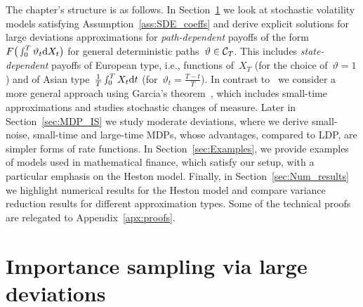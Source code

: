 
The chapter's structure is as follows. In Section~\ref{sec:LDP_IS} we look at stochastic volatility models satisfying Assumption~\ref{ass:SDE_coeffs} and derive explicit solutions for large deviations approximations for \textit{path-dependent} payoffs of the form~$F\big(\smallint _0^T\vartheta_t\mathrm{d} X_t\big)$ for general deterministic  paths~$\vartheta\in\mathcal{C}_T$. This includes \textit{state-dependent} payoffs of European type, i.e., functions of~$X_T$ (for the choice of~$\vartheta = 1$) and of Asian type~$\frac{1}{T}\smallint_0^TX_t\mathrm{d} t$ (for~$\vartheta_t = \frac{T-t}{T}$). In contrast to~\cite{Robertson2010SampleModels} we consider a more general approach using Garcia's theorem~\cite{Garcia2007AIntegrals}, which includes small-time approximations and studies stochastic changes of measure. Later in Section~\ref{sec:MDP_IS} we study moderate deviations, where we derive small-noise, small-time and large-time MDPs, whose advantages, compared to LDP, are simpler forms of rate functions. 
In Section~\ref{sec:Examples}, 
we provide examples of models used in mathematical finance, which satisfy our setup, 
with a particular emphasis on the Heston model.
Finally, in Section~\ref{sec:Num_results} we highlight numerical results for the Heston model and compare variance reduction results for different approximation types. Some of the technical proofs are relegated to Appendix~\ref{apx:proofs}.


\section{Importance sampling via large deviations}\label{sec:LDP_IS}


